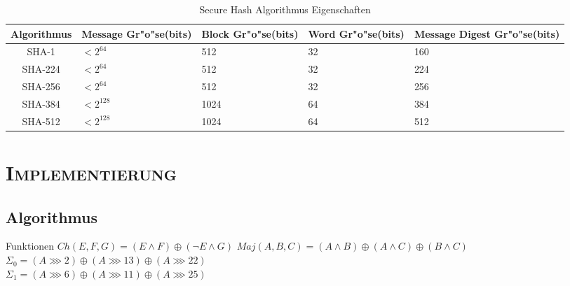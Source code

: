 \documentclass[xcolor=x11names,compress]{beamer}
\renewcommand{\(}{\begin{columns}}
\renewcommand{\)}{\end{columns}}
\newcommand{\<}[1]{\begin{column}{#1}}
\renewcommand{\>}{\end{column}}
\begin{document}
\begin{frame}[shrink=30]{}
\begin{table}[c]
\caption{Secure Hash Algorithmus Eigenschaften}
\begin{tabular}[ht]{|c|p{}|p{}|p{}|p{}|}
  \hline
  Algorithmus &  Message Gr"o"se(bits) & Block Gr"o"se(bits) & Word Gr"o"se(bits) & Message Digest Gr"o"se(bits)\\
  \hline\hline
  SHA-1   & $<2^{64}$  &  512 & 32 & 160\\
  SHA-224 & $<2^{64}$  &  512 & 32 & 224\\
  SHA-256 & $<2^{64}$  &  512 & 32 & 256\\
  SHA-384 & $<2^{128}$ & 1024 & 64 & 384\\  
  SHA-512 & $<2^{128}$ & 1024 & 64 & 512\\  
  \hline
\end{tabular}
\label{tab:meinetabelle}
\end{table}
\end{frame}


\section{\scshape Implementierung}
\subsection{Algorithmus}
\begin{frame}{Funktionen}
$ Ch(E,F,G) = (E\wedge F) \oplus (\neg E\wedge G)$
$ Maj(A,B,C) = (A\wedge B) \oplus (A\wedge C) \oplus (B\wedge C)$\\
$ \Sigma_0 = (A\ggg 2) \oplus (A\ggg 13) \oplus (A\ggg 22) $\\
$ \Sigma_1 = (A\ggg 6) \oplus (A\ggg 11) \oplus (A\ggg 25) $\\
\end{frame}
\end{document}
